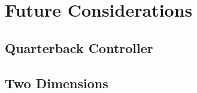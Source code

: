 
\section{Future Considerations}

\subsection{Quarterback Controller}

\blindtext

\subsection{Two Dimensions}

\blindtext %
